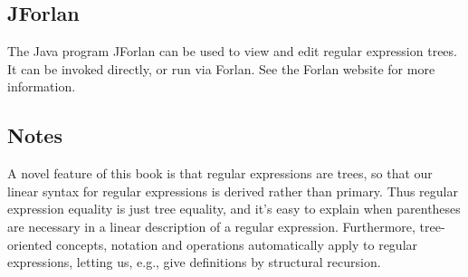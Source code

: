\subsection{JForlan}

The Java program JForlan
%
can be used to view and edit regular expression trees.  It can be
invoked directly, or run via Forlan.  See the Forlan website for more
information.

\subsection{Notes}

A novel feature of this book is that regular expressions are trees, so
that our linear syntax for regular expressions is derived rather than
primary.  Thus regular expression equality is just tree equality,
and it's easy to explain when parentheses are necessary in
a linear description of a regular expression.  Furthermore,
tree-oriented concepts, notation and operations automatically
apply to regular expressions, letting us, e.g., give definitions
by structural recursion.
%

